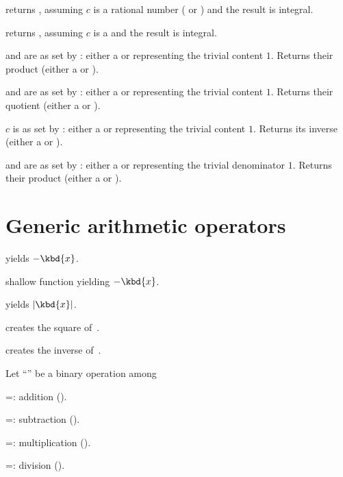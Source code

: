  returns , assuming $c$
is a rational number ( or ) and the result is integral.

 returns , assuming $c$
is a  and the result is integral.

   and  are
as set by : either a  or 
representing the trivial content $1$. Returns their product (either a
 or ).

   and  are
as set by : either a  or 
representing the trivial content $1$. Returns their quotient (either a
 or ).

 $c$ is as set by : either
a  or  representing the trivial content $1$. Returns its
inverse (either a  or ).

  and  are
as set by : either a  or  representing
the trivial denominator $1$. Returns their product (either a  or
).

\section{Generic arithmetic operators}


 yields $-\kbd{x}$.

 shallow function yielding $-\kbd{x}$.

 yields $|\kbd{x}|$.

 creates the square of~.

 creates the inverse of~.


Let ``\op'' be a binary operation among

\op=: addition ().

\op=: subtraction ().

\op=: multiplication ().

\op=: division ().

